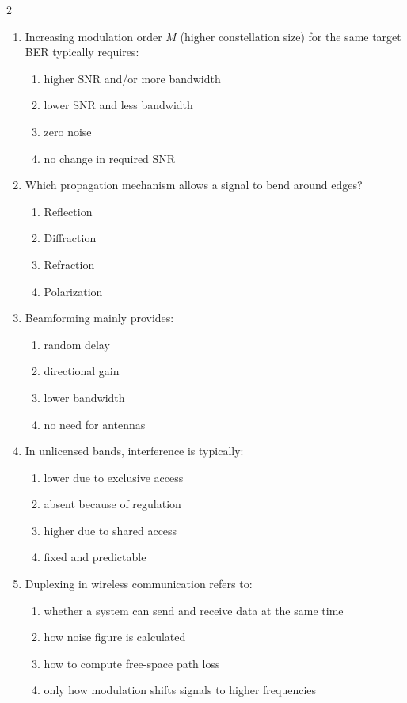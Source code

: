 \begin{multicols}{2}
\begin{enumerate}[leftmargin=*, itemsep=0.4em]
\item Increasing modulation order $M$ (higher constellation size) for the same target BER typically requires:
\begin{enumerate}[label=\alph*)]
\item higher SNR and/or more bandwidth
\item lower SNR and less bandwidth
\item zero noise
\item no change in required SNR
\end{enumerate}

\item Which propagation mechanism allows a signal to bend around edges?
\begin{enumerate}[label=\alph*)]
\item Reflection
\item Diffraction
\item Refraction
\item Polarization
\end{enumerate}

\item Beamforming mainly provides:
\begin{enumerate}[label=\alph*)]
\item random delay
\item directional gain
\item lower bandwidth
\item no need for antennas
\end{enumerate}

\item In unlicensed bands, interference is typically:
\begin{enumerate}[label=\alph*)]
\item lower due to exclusive access
\item absent because of regulation
\item higher due to shared access
\item fixed and predictable
\end{enumerate}

\item Duplexing in wireless communication refers to:
\begin{enumerate}[label=\alph*)]
\item whether a system can send and receive data at the same time
\item how noise figure is calculated
\item how to compute free-space path loss
\item only how modulation shifts signals to higher frequencies
\end{enumerate}


\end{enumerate}
\end{multicols}
